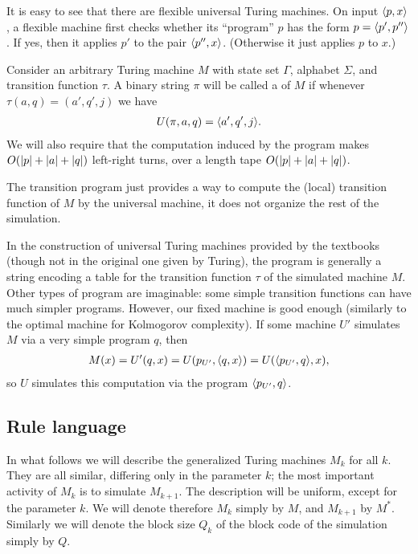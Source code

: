 \documentclass[12pt]{memoir}
\newcommand{\Q}{Q}
\begin{document}
It is easy to see that there are flexible universal Turing machines.
On input \( {\mathopen\langle p,x\mathclose\rangle} \),
a flexible machine first checks whether its ``program'' \( p \) 
has the form \( p={\mathopen\langle p',p''\mathclose\rangle} \).
If yes, then it applies \( p' \) to the pair \( {\mathopen\langle p'',x\mathclose\rangle} \).
(Otherwise it just applies \( p \) to \( x \).)

\begin{definition}
  Consider an arbitrary Turing machine \( M \) with state set \( \Gamma \), alphabet
\( \Sigma \), and transition function \( \tau \).
A binary string \( \pi \) will be called a  of \( M \) if
whenever \( \tau(a,q)=(a',q',j) \) we have
 \begin{align*}
 U(\pi,a,q)={\mathopen\langle a',q',j\mathclose\rangle}.
 \end{align*}
We will also require that the computation induced by the program makes
\( O(\lvert p \rvert+\lvert a \rvert+\lvert q \rvert) \) left-right turns, over a length tape \( O(\lvert p \rvert+\lvert a \rvert+\lvert q \rvert) \).
\end{definition}

The transition program just provides a way to compute
the (local) transition function of \( M \) by the universal machine,
it does not organize the rest of the simulation.

\begin{remark}
 In the construction of universal Turing machines provided by the textbooks
(though not in the original one given by Turing), the program is generally a string
encoding a table for the transition
function \( \tau \) of the simulated machine \( M \).
Other types of program are imaginable: some simple transition functions can
have much simpler programs.
However, our fixed machine is good enough (similarly to the optimal machine
for Kolmogorov complexity).
If some machine \( U' \) simulates \( M \) via a
very simple program \( q \), then
 \begin{align*}
     M(x)=U'(q,x) = U(p_{U'},{\mathopen\langle q,x\mathclose\rangle}) = U({\mathopen\langle p_{U'},q\mathclose\rangle},x),
 \end{align*}
so \( U \) simulates this computation via the program \( {\mathopen\langle p_{U'},q\mathclose\rangle} \).
\end{remark}

\subsection{Rule language}\label{sec:language}

In what follows we will describe the generalized Turing machines \( M_{k} \) for all \( k \).
They are all similar, differing only in the parameter \( k \); the most important activity
of \( M_{k} \) is to simulate \( M_{k+1} \).
The description will be uniform, except for the parameter \( k \).
We will denote therefore \( M_{k} \) simply by \( M \), and \( M_{k+1} \)  by \( M^{*} \).
Similarly we will denote the block size \( \Q_{k} \) of the block code of the 
simulation simply by \( \Q \).
\end{document}
